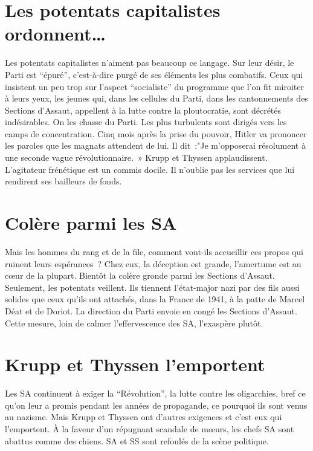 \documentclass[french,twoside]{book} %
\begin{document}
\section[{Les potentats capitalistes ordonnent…}]{Les potentats capitalistes ordonnent…}
\noindent Les potentats capitalistes n’aiment pas beaucoup ce langage. Sur leur désir, le Parti est “épuré”, c’est-à-dire purgé de ses éléments les plus combatifs. Ceux qui insistent un peu trop sur l’aspect “socialiste” du programme que l’on fit miroiter à leurs yeux, les jeunes qui, dans les cellules du Parti, dans les cantonnements des Sections d’Assaut, appellent à la lutte contre la ploutocratie, sont décrétés indésirables. On les chasse du Parti. Les plus turbulents sont dirigés vers les camps de concentration. Cinq mois après la prise du pouvoir, Hitler va prononcer les paroles que les magnats attendent de lui. Il dit :"Je m’opposerai résolument à une seconde vague révolutionnaire. » Krupp et Thyssen applaudissent. L’agitateur frénétique est un commis docile. Il n’oublie pas les services que lui rendirent ses bailleurs de fonds.
\section[{Colère parmi les SA}]{Colère parmi les SA}
\noindent Mais les hommes du rang et de la file, comment vont-ils accueillir ces propos qui ruinent leurs espérances ? Chez eux, la déception est grande, l’amertume est au cœur de la plupart. Bientôt la colère gronde parmi les Sections d’Assaut. Seulement, les potentats veillent. Ils tiennent l’état-major nazi par des fils aussi solides que ceux qu’ils ont attachés, dans la France de 1941, à la patte de Marcel Déat et de Doriot. La direction du Parti envoie en congé les Sections d’Assaut. Cette mesure, loin de calmer l’effervescence des SA, l’exaspère plutôt.
\section[{Krupp et Thyssen l’emportent}]{Krupp et Thyssen l’emportent}
\noindent Les SA continuent à exiger la “Révolution”, la lutte contre les oligarchies, bref ce qu’on leur a promis pendant les années de propagande, ce pourquoi ils sont venus au nazisme. Mais Krupp et Thyssen ont d’autres exigences et c’est eux qui l’emportent. À la faveur d’un répugnant scandale de mœurs, les chefs SA sont abattus comme des chiens. SA et SS sont refoulés de la scène politique.
\end{document}
